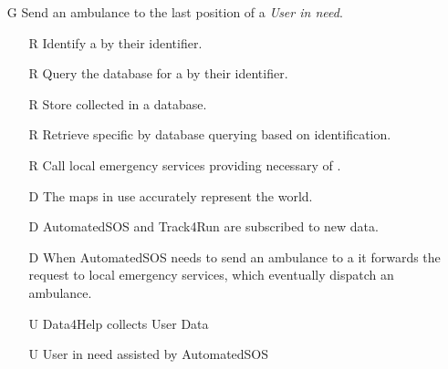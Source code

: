 \documentclass[../../../rasd.tex]{subfiles}
\begin{document}
\begin{itemize}
    \item[G\subs{7}]Send an ambulance to the last position of a \textit{User in need}.
    \begin{itemize}
        \item[R\subs{6}]Identify a  by their identifier.
        \item[R\subs{7}]Query the database for a  by their identifier.
        \item[R\subs{11}]Store collected  in a database.
        \item[R\subs{12}]Retrieve specific  by database querying based on  identification.
        \item[R\subs{37}]Call local emergency services providing necessary  of .
        \\
        \item[D\subs{3}]The maps in use accurately represent the world.
        \item[D\subs{6}]AutomatedSOS and Track4Run are subscribed to new data.
        \item[D\subs{7}]When AutomatedSOS needs to send an ambulance to a  it forwards the request to local emergency services, which eventually dispatch an ambulance.
        \\
        \item[U\subs{5}]Data4Help collects User Data
        \item[U\subs{12}]User in need assisted by AutomatedSOS
    \end{itemize}
\end{itemize}
\end{document}

